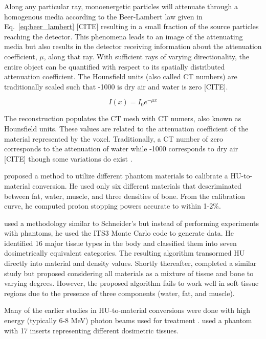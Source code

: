 Along any particular ray, monoenergetic particles will attenuate through a homogenous media according to the Beer-Lambert law given in Eq.~\ref{eq:beer_lambert} [CITE] resulting in a small fraction of the source particles reaching the detector. This phenomena leads to an image of the attenuating media but also results in the detector receiving information about the attenuation coefficient, $\mu$, along that ray. With sufficient rays of varying directionality, the entire object can be quantified with respect to its spatially distributed attenuation coefficient. The Hounsfield units (also called CT numbers) are traditionally scaled such that -1000 is dry air and water is zero [CITE].

\begin{equation}\label{eq:beer_lambert}
I(x) = I_0 e^{-\mu x}
\end{equation}

The reconstruction populates the CT mesh with CT numers, also known as Hounsfield units. These values are related to the attenuation coefficient of the material represented by the voxel. Traditionally, a CT number of zero corresponds to the attenuation of water while -1000 corresponds to dry air [CITE] though some variations do exist \citep{ref:plessisf} \citep{ref:sawc}.

\citet{ref:schneideru} proposed a method to utilize different phantom materials to calibrate a HU-to-material conversion. He used only six different materials that descriminated between fat, water, muscle, and three densities of bone. From the calibration curve, he computed proton stopping powers accurate to within 1-2\%.

\citet{ref:plessisf} used a methodology similar to Schneider's but instead of performing experiments with phantoms, he used the ITS3 \citep{ref:halbleibj} Monte Carlo code to generate data. He identified 16 major tissue types in the body and classified them into seven dosimetrically equivalent categories. The resulting algorithm transormed HU directly into material and density values. Shortly thereafter, \citet{ref:schneiderw} completed a similar study but proposed considering all materials as a mixture of tissue and bone to varying degrees. However, the proposed algorithm fails to work well in soft tissue regions due to the presence of three components (water, fat, and muscle).

Many of the earlier studies in HU-to-material conversions were done with high energy (typically 6-8 MeV) photon beams used for treatment \citep{ref:kimh} \citep{ref:vanderstraetenb}. \citet{ref:sawc} used a phantom with 17 inserts representing different dosimetric tissues.

